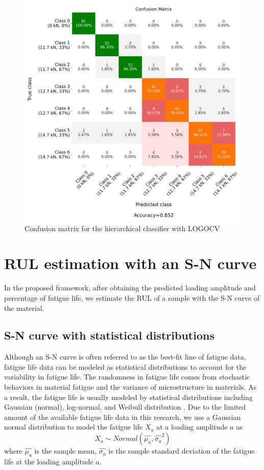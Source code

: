 \begin{figure}[tb]
    \centering
    \includegraphics[width=0.75\linewidth]{fig/hierarchical_confusion_matrix.png}
    \caption{Confusion matrix for the hierarchical classifier with LOGOCV}
    \label{fig: confu mat hier}
\end{figure}


\section{RUL estimation with an S-N curve}
In the proposed framework, after obtaining the predicted loading amplitude and percentage of fatigue life, we estimate the RUL of a sample with the S-N curve of the material.

\subsection{S-N curve with statistical distributions}
\label{subsec: statistical sn curve}
Although an S-N curve is often referred to as the best-fit line of fatigue data, fatigue life data can be modeled as statistical distributions to account for the variability in fatigue life. The randomness in fatigue life comes from stochastic behaviors in material fatigue and the variance of microstructure in materials. As a result, the fatigue life is usually modeled by statistical distributions including Gaussian (normal), log-normal, and Weibull distribution \cite{sn-curve-statistical-model-LI2016}. Due to the limited amount of the available fatigue life data in this research, we use a Gaussian normal distribution to model the fatigue life $X_a$ at a loading amplitude $a$ as
\begin{equation}
    X_a \sim Normal(\hat{\mu_{a}}, \hat{\sigma_{a}}^2)
\end{equation}
where $\hat{\mu_{a}}$ is the sample mean, $\hat{\sigma_{a}}$ is the sample standard deviation of the fatigue life at the loading amplitude $a$.

